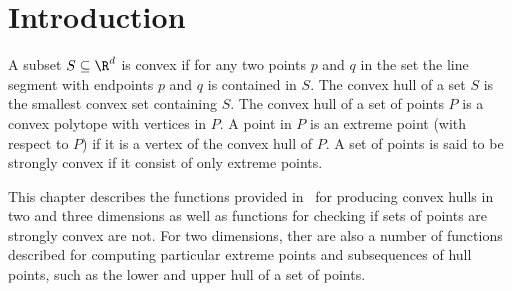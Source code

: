 \section{Introduction}

A subset $S \subseteq \R^d$ is convex if for any two points $p$ and $q$
in the set the line segment with endpoints $p$ and $q$ is contained
in $S$. The convex hull of a set $S$ 
is the smallest convex set containing
$S$. The convex hull of a set of points $P$ is a convex 
polytope with vertices in $P$. A point in $P$ is an extreme point 
(with respect to $P$) if it is a vertex of 
the convex hull of $P$.  A set of points is said to be strongly convex %
 if it consist of only extreme points.

This chapter describes the functions provided in
\cgal\ for producing convex hulls in two and three dimensions as well as
functions for checking if sets of points are strongly convex are not.  
For two dimensions, ther are also a number of functions described for
computing particular extreme points and subsequences of hull points,
such as the lower and upper hull of a set of points.
